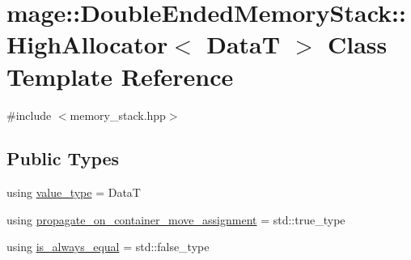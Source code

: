 \hypertarget{classmage_1_1_double_ended_memory_stack_1_1_high_allocator}{}\section{mage\+:\+:Double\+Ended\+Memory\+Stack\+:\+:High\+Allocator$<$ DataT $>$ Class Template Reference}
\label{classmage_1_1_double_ended_memory_stack_1_1_high_allocator}


{\ttfamily \#include $<$memory\+\_\+stack.\+hpp$>$}

\subsection*{Public Types}
\begin{DoxyCompactItemize}
\item 
using \mbox{\hyperlink{classmage_1_1_double_ended_memory_stack_1_1_high_allocator_a43b87cea37b3bbba57ca794e9785e82d}{value\+\_\+type}} = DataT
\item 
using \mbox{\hyperlink{classmage_1_1_double_ended_memory_stack_1_1_high_allocator_a62088aeffb56b35539d9080aabc43134}{propagate\+\_\+on\+\_\+container\+\_\+move\+\_\+assignment}} = std\+::true\+\_\+type
\item 
using \mbox{\hyperlink{classmage_1_1_double_ended_memory_stack_1_1_high_allocator_af6ec362496ffae52532f1bb57170edf7}{is\+\_\+always\+\_\+equal}} = std\+::false\+\_\+type
\end{DoxyCompactItemize}
